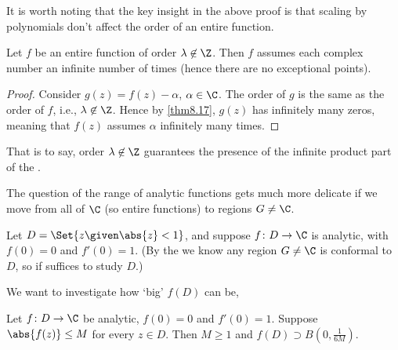 It is worth noting that the key insight in the above proof is that scaling by polynomials don't affect the order of an entire function.

\begin{corollary}\label{cor8.18}
	Let $f$ be an entire function of order $\lambda \not\in \Z$.
	Then $f$ assumes each complex number an infinite number of times (hence there are no exceptional points).
\end{corollary}

\begin{proof}
	Consider $g(z) = f(z) - \alpha$, $\alpha \in \C$.
	The order of $g$ is the same as the order of $f$, i.e., $\lambda \not\in \Z$.
	Hence by \autoref{thm8.17}, $g(z)$ has infinitely many zeros, meaning that $f(z)$ assumes $\alpha$ infinitely many times.
\end{proof}

That is to say, order $\lambda \not\in \Z$ guarantees the presence of the infinite product part of the .

The question of the range of analytic functions gets much more delicate if we move from all of $\C$ (so entire functions) to regions $G \neq \C$.


Let $D = \Set{z \given \abs{z} < 1}$, and suppose $f \colon D \to \C$ is analytic, with $f(0) = 0$ and $f'(0) = 1$.
(By the  we know any region $G \neq \C$ is conformal to $D$, so if suffices to study $D$.)

We want to investigate how `big' $f(D)$ can be,

\begin{lemma}\label{lem9.1}
	Let $f \colon D \to \C$ be analytic, $f(0) = 0$ and $f'(0) = 1$.
	Suppose $\abs{f(z)} \leq M$ for every $z \in D$.
	Then $M \geq 1$ and $f(D) \supset B(0, \frac{1}{6 M})$.
\end{lemma}

